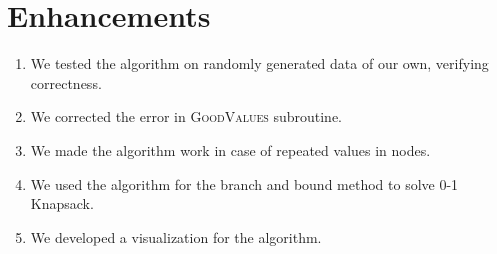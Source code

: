 \documentclass{article}
\begin{document}
\section{Enhancements}
\begin{enumerate}
    \item We tested the algorithm on randomly generated data of our own, verifying correctness.
    \item We corrected the error in \textsc{GoodValues} subroutine.
    \item We made the algorithm work in case of repeated values in nodes.
    \item We used the algorithm for the branch and bound method to solve 0-1 Knapsack.
    \item We developed a visualization for the algorithm.
\end{enumerate}


\end{document}
